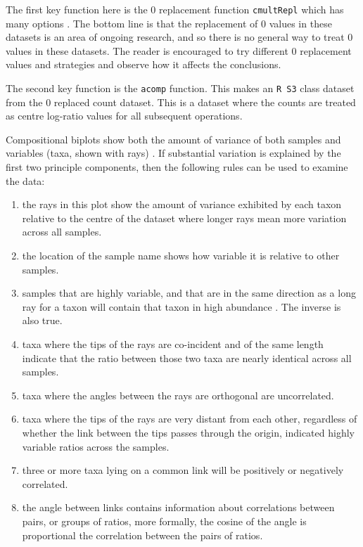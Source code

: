 \documentclass[11pt]{article}\usepackage[]{graphicx}\usepackage[]{color}
\begin{document}
The first key function here is the 0 replacement function  {\tt cmultRepl} which has many options \cite{PalareaAlbaladejo201585}. The bottom line is that the replacement of 0 values in these datasets is an area of ongoing research, and so there is no general way to treat 0 values in these datasets. The reader is encouraged to try different 0 replacement values and strategies and observe how it affects the conclusions. 

The second key function is the {\tt acomp} function. This makes an {\tt R S3} class dataset from the 0 replaced count dataset. This is a dataset where the counts are treated as centre log-ratio values for all subsequent operations. 

Compositional biplots show both the amount of variance of both samples and variables (taxa, shown with rays) \cite{aitchison2002biplots}.  If substantial variation is explained by the first two principle components, then the following rules can be used to examine the data:

\begin{enumerate}

\item the rays in this plot show the amount of variance exhibited by each taxon relative to the centre of the dataset where longer rays mean more variation across all samples.

\item the location of the sample name shows how variable it is relative to other samples.

\item samples that are highly variable, and that are in the same direction as a long ray for a taxon will contain that taxon in high abundance . The inverse is also true.

\item taxa where the tips of the rays are co-incident and of the same length indicate that the ratio between those two taxa are nearly identical across all samples.

\item taxa where the angles between the rays are orthogonal are uncorrelated.

\item taxa where the tips of the rays are very distant from each other, regardless of whether the link between the tips passes through the origin, indicated highly variable ratios across the samples.

\item three or more taxa lying on a common link will be positively or negatively correlated. 

\item the angle between links contains information about correlations between pairs, or groups of ratios, more formally, the cosine of the angle is proportional the correlation between the pairs of ratios.


\end{enumerate} 
\end{document}
